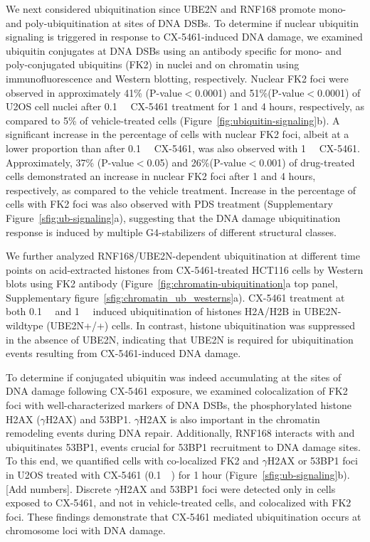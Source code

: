 We next considered ubiquitination since UBE2N and RNF168 promote mono- and poly-ubiquitination at sites of DNA DSBs. 
To determine if nuclear ubiquitin signaling is triggered in response to CX-5461-induced DNA damage, we examined ubiquitin conjugates at DNA DSBs using an antibody specific for mono- and poly-conjugated ubiquitins (FK2) in nuclei and on chromatin using immunofluorescence and Western blotting, respectively.
Nuclear FK2 foci were observed in approximately 41\% (P-value$<$0.0001) and 51\%(P-value$<$0.0001) of U2OS cell nuclei after \SI{0.1}{\micro\Molar} CX-5461 treatment for 1 and 4 hours, respectively, as compared to 5\% of vehicle-treated cells (Figure~\ref{fig:ubiquitin-signaling}b). 
A significant increase in the percentage of cells with nuclear FK2 foci, albeit at a lower proportion than after \SI{0.1}{\micro\Molar} CX-5461, was also observed with \SI{1}{\micro\Molar} CX-5461. Approximately, 37\% (P-value$<$0.05) and 26\%(P-value$<$0.001) of drug-treated cells demonstrated an increase in nuclear FK2 foci after 1 and 4 hours, respectively, as compared to the vehicle treatment. Increase in the percentage of cells with FK2 foci was also observed with PDS treatment (Supplementary Figure~\ref{sfig:ub-signaling}a), suggesting that the DNA damage ubiquitination response is induced by multiple G4-stabilizers of different structural classes.

We further analyzed RNF168/UBE2N-dependent ubiquitination at different time points on acid-extracted histones from CX-5461-treated HCT116 cells by Western blots using FK2 antibody (Figure~\ref{fig:chromatin-ubiquitination}a top panel, Supplementary figure~\ref{sfig:chromatin_ub_westerns}a). 
CX-5461 treatment at both \SI{0.1}{\micro\Molar} and \SI{1}{\micro\Molar} induced ubiquitination of histones H2A/H2B in UBE2N-wildtype (UBE2N+/+) cells. 
In contrast, histone ubiquitination was suppressed in the absence of UBE2N, indicating that UBE2N is required for ubiquitination events resulting from CX-5461-induced DNA damage.

To determine if conjugated ubiquitin was indeed accumulating at the sites of DNA damage following CX-5461 exposure, we examined colocalization of FK2 foci with well-characterized markers of DNA DSBs, the phosphorylated histone H2AX ($\gamma$H2AX) and 53BP1. $\gamma$H2AX is also important in the chromatin remodeling events during DNA repair. Additionally, RNF168 interacts with and ubiquitinates 53BP1, events crucial for 53BP1 recruitment to DNA damage sites\cite{Fradet-Turcotte2013a}. 
To this end, we quantified cells with co-localized FK2 and $\gamma$H2AX or 53BP1 foci in U2OS treated with CX-5461 (\SI{0.1}{\micro\Molar}) for 1 hour (Figure~\ref{sfig:ub-signaling}b).[Add numbers]. Discrete $\gamma$H2AX and 53BP1 foci were detected only in cells exposed to CX-5461, and not in vehicle-treated cells, and colocalized with FK2 foci. 
These findings demonstrate that CX-5461 mediated ubiquitination occurs at chromosome loci with DNA damage.

